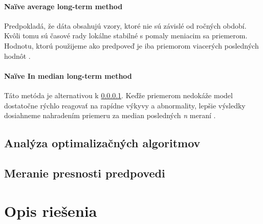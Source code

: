 \documentclass[a4paper,slovak,12pt,appendix]{article}
\begin{document}
\paragraph{Naïve average long-term method} \label{naive-average}
Predpokladá, že dáta obsahujú vzory, ktoré nie sú závislé od ročných období.
Kvôli tomu sú časové rady lokálne stabilné s pomaly meniacim sa priemerom.
Hodnotu, ktorú použijeme ako predpoveď je iba priemorom viacerých posledných
hodnôt \cite{Grmanova2016}.

\paragraph{Naïve In median long-term method}
Táto metóda je alternativou k \ref{naive-average}. Keďže priemerom nedokáže
model dostatočne rýchlo reagovať na rapídne výkyvy a abnormality, lepšie
výsledky dosiahneme nahradením priemeru za median posledných \textit{n}
meraní \cite{Grmanova2016}.


\subsection{Analýza optimalizačných algoritmov}



\subsection{Meranie presnosti predpovedi}


\newpage
\section{Opis riešenia}

\end{document}
